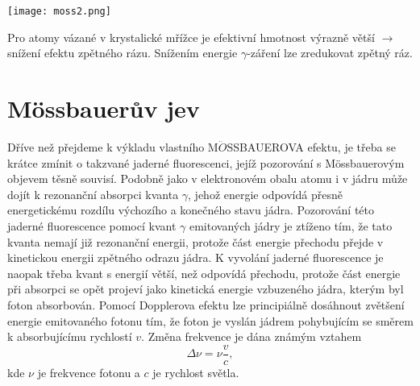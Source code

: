 \documentclass[../../main.tex]{subfiles}
\begin{document}
\begin{center}
	\texttt{[image: moss2.png]}
\end{center}

Pro atomy vázané v krystalické mřížce je efektivní hmotnost výrazně větší $\rightarrow$ snížení efektu zpětného rázu. Snížením energie $\gamma$-záření lze zredukovat zpětný ráz.  

\section{Mössbauerův jev}

Dříve než přejdeme k výkladu vlastního M$\ddot{O}$SSBAUEROVA efektu, je třeba se krátce zmínit o takzvané jaderné fluorescenci, jejíž pozorování s Mössbauerovým objevem těsně souvisí. Podobně jako v elektronovém obalu atomu i v jádru může dojít k rezonanční absorpci kvanta $\gamma$, jehož energie odpovídá přesně energetickému rozdílu výchozího a konečného stavu jádra. Pozorování této jaderné fluorescence pomocí
kvant $\gamma$ emitovaných jádry je ztíženo tím, že tato kvanta nemají již rezonanční energii, protože část energie přechodu přejde v kinetickou energii zpětného odrazu jádra. K vyvolání jaderné fluorescence je naopak třeba kvant s energií větší, než odpovídá přechodu, protože část energie při absorpci se opět projeví
jako kinetická energie vzbuzeného jádra, kterým byl foton absorbován. Pomocí Dopplerova efektu lze principiálně dosáhnout zvětšení energie emitovaného fotonu tím, že foton je vyslán jádrem pohybujícím se směrem k absorbujícímu rychlostí $v$. Změna frekvence je dána známým vztahem
\begin{equation}
\Delta \nu = \nu \dfrac{v}{c},
\end{equation}
kde $\nu$ je frekvence fotonu a $c$ je rychlost světla.
\end{document}

